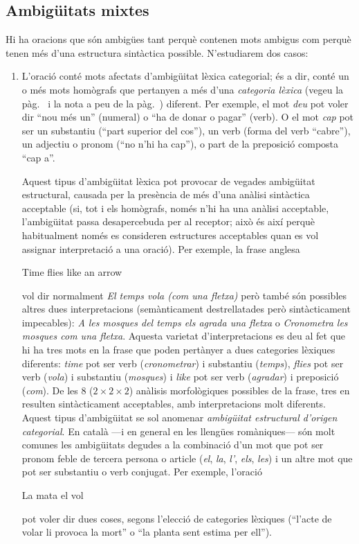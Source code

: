 \subsection{Ambigüitats mixtes}
Hi ha oracions que són ambigües tant perquè contenen mots ambigus com
perquè tenen més d'una estructura sintàctica possible. N'estudiarem
dos casos:
\begin{enumerate}
\item L'oració conté mots afectats d'ambigüitat lèxica categorial; és
  a dir, conté un o més mots homògrafs  que pertanyen a més d'una {\em
    categoria lèxica} (vegeu la pàg.~\pageref{pg:catlex} i la nota a
  peu de la pàg.~\pageref{pg:catgra}) diferent.  Per exemple, el mot {\em
    deu} pot voler dir ``nou més un'' (numeral) o ``ha de donar o
  pagar'' (verb).  O el mot \emph{cap} pot ser un substantiu (``part
  superior del cos''), un verb (forma del verb ``cabre''), un adjectiu
  o pronom (``no n'hi ha cap''), o part de la preposició composta
  ``cap a''.
  
  Aquest tipus d'ambigüitat lèxica pot provocar de vegades ambigüitat
  estructural, causada per la presència de més d'una anàlisi
  sintàctica acceptable (si, tot i els homògrafs, només n'hi ha una
  anàlisi acceptable, l'ambigüitat passa desapercebuda per al
  receptor; això és així perquè habitualment només es consideren
  estructures acceptables quan es vol assignar interpretació a una
  oració).  Per exemple, la frase anglesa
  \begin{exemple}
  Time flies like an arrow
  \end{exemple}
  vol dir normalment \emph{El temps vola (com una fletxa)} però també
  són possibles altres dues interpretacions (semànticament
  destrellatades però sintàcticament impecables): \emph{A les mosques
    del temps els agrada una fletxa} o \emph{Cronometra les mosques
    com una fletxa}.  Aquesta varietat d'interpretacions es deu al fet
  que hi ha tres mots en la frase que poden pertànyer a dues
  categories lèxiques diferents: \emph{time} pot ser verb (\emph{cronometrar}) i
  substantiu (\emph{temps}), \emph{flies} pot ser verb (\emph{vola}) i
  substantiu (\emph{mosques}) i \emph{like}
  pot ser verb (\emph{agradar}) i preposició (\emph{com}).  De les 8 ($2\times 2\times 2$) anàlisis
  morfològiques possibles de la frase, tres en resulten sintàcticament
  acceptables, amb interpretacions molt diferents. Aquest tipus
  d'ambigüitat se sol anomenar \emph{ambigüitat estructural d'origen
    categorial}. En català ---i en general en les llengües romàniques--- són molt comunes les
  ambigüitats degudes a la combinació d'un mot que pot ser pronom
  feble de tercera persona o article (\emph{el}, \emph{la}, \emph{l'},
  \emph{els}, \emph{les}) i un altre mot que pot ser substantiu o verb
  conjugat. Per exemple, l'oració
    \begin{exemple}
    La mata el vol
    \end{exemple} 
    pot voler dir dues coses, segons l'elecció de categories
    lèxiques (``l'acte de volar li provoca la mort'' o ``la planta
    sent estima per ell'').
  

\end{enumerate}
